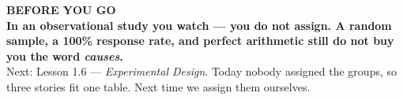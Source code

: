 \documentclass[aspectratio=169, 11pt]{beamer}
\begin{document}
{
\begin{frame}[plain]
  \vspace{1.5cm}\hspace{0.8cm}%
  \begin{minipage}{0.86\textwidth}
    {\color{goldacc}\bfseries\small BEFORE YOU GO}\\[0.7cm]
    {\color{white}\bfseries\Large In an observational study you watch --- you do not assign. A
    random sample, a 100\% response rate, and perfect arithmetic still do not buy you the word
    \emph{causes}.}\\[0.9cm]
    {\color{frostmid}\small Next: Lesson 1.6 --- \emph{Experimental Design}. Today nobody
    assigned the groups, so three stories fit one table. Next time we assign them ourselves.}
  \end{minipage}
\end{frame}
}
\end{document}
